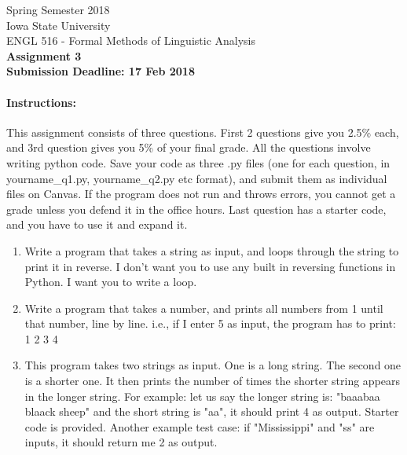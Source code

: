 \documentclass[11pt,a4paper]{article}
\begin{document}
\begin{center}
  Spring Semester 2018 \\ Iowa State University\\[3ex]
  {\large ENGL 516 - Formal Methods of Linguistic Analysis}\\[3ex]
  \textbf{Assignment 3} \\ \textbf{Submission Deadline: 17 Feb 2018}
\end{center}

\paragraph{Instructions:} This assignment consists of three questions. First 2 questions give you 2.5\% each, and 3rd question gives you 5\% of your final grade. All the questions involve writing python code. Save your code as three .py files (one for each question, in yourname\_q1.py, yourname\_q2.py etc format), and submit them as individual files on Canvas. If the program does not run and throws errors, you cannot get a grade unless you defend it in the office hours. Last question has a starter code, and you have to use it and expand it.

\begin{enumerate}
\item Write a program that takes a string as input, and loops through the string to print it in reverse. I don't want you to use any built in reversing functions in Python. I want you to write a loop.
\item Write a program that takes a number, and prints all numbers from 1 until that number, line by line. i.e., if I enter 5 as input, the program has to print:
1
2
3
4
\item This program takes two strings as input. One is a long string. The second one is a shorter one. It then prints the number of times the shorter string appears in the longer string. For example: let us say the longer string is: "baaabaa blaack sheep" and the short string is "aa", it should print 4 as output. Starter code is provided. Another example test case: if "Mississippi" and "ss" are inputs, it should return me 2 as output. 
\end{enumerate}

\end{document}
